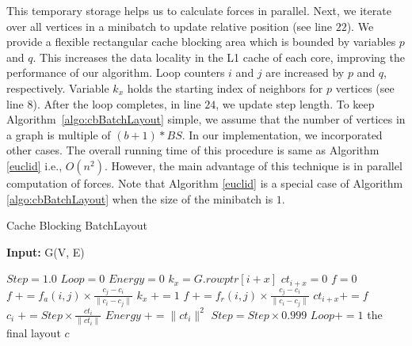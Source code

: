 \documentclass{vgtc}
\newcommand{\toolname}{{BatchLayout}}
\begin{document}
This temporary storage helps us to calculate forces in parallel. 
Next, we iterate over all vertices in a minibatch to update relative position (see line $22$).  
We provide a flexible rectangular cache blocking area which is bounded by variables $p$ and $q$. 
This increases the data locality in the L1 cache of each core, improving the performance of our algorithm. 
Loop counters $i$ and $j$ are increased by $p$ and $q$, respectively. 
Variable $k_x$ holds the starting index of neighbors for $p$ vertices (see line $8$). After the loop completes, in line $24$, we update step length. 
To keep Algorithm~\ref{algo:cbBatchLayout} simple, we assume that the number of vertices in a graph is multiple of $(b+1)*BS$.
In our implementation, we incorporated other cases.
The overall running time of this procedure is same as Algorithm \ref{euclid} i.e., $O(n^2)$. However, the main advantage of this technique is in parallel computation of forces. 
Note that Algorithm \ref{euclid} is a special case of Algorithm \ref{algo:cbBatchLayout} when the size of the minibatch is $1$.
 

\begin{algorithm}
\caption{Cache Blocking \toolname}
\hspace*{\algorithmicindent} \textbf{Input:} G(V, E)
\begin{algorithmic}[1]
\State $Step = 1.0$ 
\State $Loop = 0$
\State $Energy = 0$
            \State $k_{x} = G.rowptr[i+x]$
			\State $ct_{i+x} = 0$
        \EndFor
            \State $f = 0$
                    \State $f\;+= f_a(i,j)\times \frac{c_j - c_i}{\parallel c_i - c_j\parallel}$
                    \State $k_x\;+=1$
                \Else 
                    \State $f\; += f_r(i,j)\times \frac{c_j - c_i}{\parallel c_i - c_j\parallel}$
                \EndIf
                \EndFor
                \State $ct_{i+x} += f$ 
            \EndFor
        \EndFor
    \EndParFor
        \State $c_i\; += Step \times \frac{ct_i}{\parallel ct_i\parallel}$
        \State $Energy\; += \parallel ct_i\parallel^2$
    \EndFor
\EndFor
\State $Step = Step \times 0.999$
\State $Loop += 1$
\EndWhile
\State \Return the final layout $c$
\end{algorithmic}
\label{algo:cbBatchLayout}
\end{algorithm}
\end{document}
